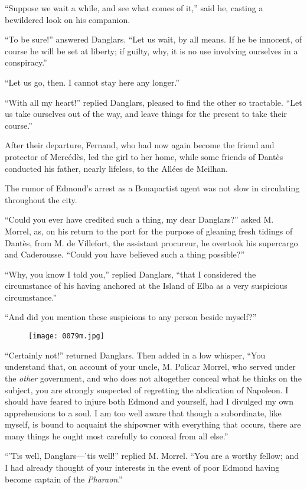 “Suppose we wait a while, and see what comes of it,” said he, casting a
bewildered look on his companion.

“To be sure!” answered Danglars. “Let us wait, by all means. If he be
innocent, of course he will be set at liberty; if guilty, why, it is no
use involving ourselves in a conspiracy.”

“Let us go, then. I cannot stay here any longer.”

“With all my heart!” replied Danglars, pleased to find the other so
tractable. “Let us take ourselves out of the way, and leave things for
the present to take their course.”

After their departure, Fernand, who had now again become the friend and
protector of Mercédès, led the girl to her home, while some friends of
Dantès conducted his father, nearly lifeless, to the Allées de Meilhan.

The rumor of Edmond’s arrest as a Bonapartist agent was not slow in
circulating throughout the city.

“Could you ever have credited such a thing, my dear Danglars?” asked M.
Morrel, as, on his return to the port for the purpose of gleaning fresh
tidings of Dantès, from M. de Villefort, the assistant procureur, he
overtook his supercargo and Caderousse. “Could you have believed such a
thing possible?”

“Why, you know I told you,” replied Danglars, “that I considered the
circumstance of his having anchored at the Island of Elba as a very
suspicious circumstance.”

“And did you mention these suspicions to any person beside myself?”

\begin{figure}[h]
\texttt{[image: 0079m.jpg]}
\end{figure}

“Certainly not!” returned Danglars. Then added in a low whisper, “You
understand that, on account of your uncle, M. Policar Morrel, who
served under the \textit{other} government, and who does not altogether
conceal what he thinks on the subject, you are strongly suspected of
regretting the abdication of Napoleon. I should have feared to injure
both Edmond and yourself, had I divulged my own apprehensions to a
soul. I am too well aware that though a subordinate, like myself, is
bound to acquaint the shipowner with everything that occurs, there are
many things he ought most carefully to conceal from all else.”

“’Tis well, Danglars—’tis well!” replied M. Morrel. “You are a worthy
fellow; and I had already thought of your interests in the event of
poor Edmond having become captain of the \textit{Pharaon}.”

